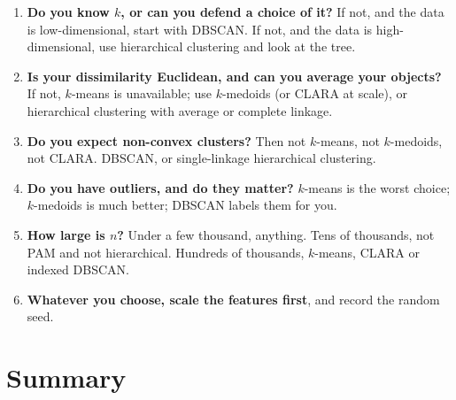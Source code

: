 \documentclass[11pt]{article}
\begin{document}
\begin{enumerate}[leftmargin=*]
  \item \textbf{Do you know $k$, or can you defend a choice of it?} If not,
    and the data is low-dimensional, start with DBSCAN. If not, and the data
    is high-dimensional, use hierarchical clustering and look at the tree.
  \item \textbf{Is your dissimilarity Euclidean, and can you average your
    objects?} If not, $k$-means is unavailable; use $k$-medoids (or CLARA at
    scale), or hierarchical clustering with average or complete linkage.
  \item \textbf{Do you expect non-convex clusters?} Then not $k$-means, not
    $k$-medoids, not CLARA. DBSCAN, or single-linkage hierarchical
    clustering.
  \item \textbf{Do you have outliers, and do they matter?} $k$-means is the
    worst choice; $k$-medoids is much better; DBSCAN labels them for you.
  \item \textbf{How large is $n$?} Under a few thousand, anything. Tens of
    thousands, not PAM and not hierarchical. Hundreds of thousands,
    $k$-means, CLARA or indexed DBSCAN.
  \item \textbf{Whatever you choose, scale the features first}, and record
    the random seed.
\end{enumerate}

\section{Summary}
\label{sec:summary}
\end{document}
